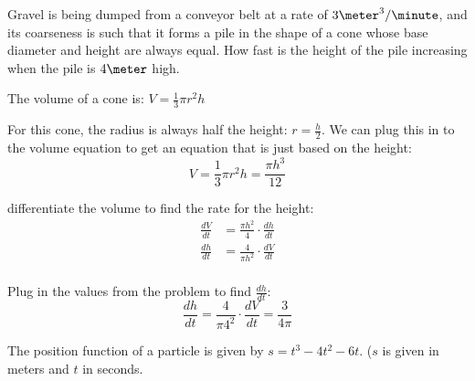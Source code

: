 \documentclass[fleqn,addpoints]{exam}
\begin{document}
\begin{questions}
\begin{solution}
\end{solution}

\question Gravel is being dumped from a conveyor belt at a rate of $3 \meter^3/\minute$, and its coarseness is such
that it forms a pile in the shape of a cone whose base diameter and height are always equal. How fast is the height of
the pile increasing when the pile is $4 \meter$ high.

\begin{solution}
The volume of a cone is: $V = \frac{1}{3} \pi r^2h$

For this cone, the radius is always half the height: $r = \frac{h}{2}$.  We can plug this in to the volume equation to
get an equation that is just based on the height:
\[
  V = \frac{1}{3} \pi r^2h = \frac{\pi h^3}{12}
\] 

differentiate the volume to find the rate for the height:
\begin{align*}
  \frac{dV}{dt} &= \frac{\pi h^2}{4} \cdot \frac{dh}{dt} \\
  \frac{dh}{dt} &= \frac{4}{\pi h^2} \cdot \frac{dV}{dt} \\
\end{align*}

Plug in the values from the problem to find $\frac{dh}{dt}$:
\[
  \frac{dh}{dt} = \frac{4}{\pi 4^2} \cdot \frac{dV}{dt} = \frac{3}{4 \pi}
\]

\end{solution}

\question
The position function of a particle is given by $s = t^3 - 4t^2 - 6t$. ($s$ is given in meters and $t$ in seconds.
\end{questions}
\end{document}
